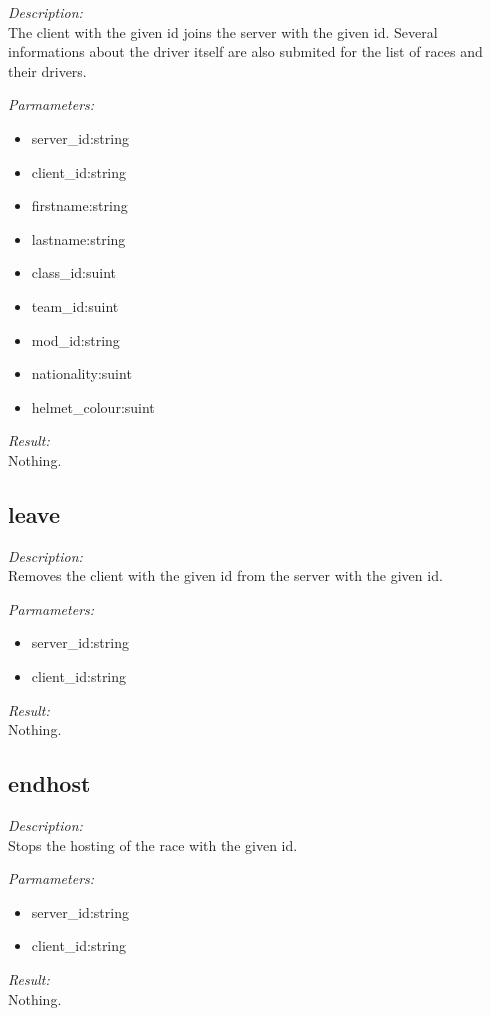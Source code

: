 \begin{description}
\item {\it Description:}\\
The client with the given id joins the server with the given id. Several informations about the driver itself are also submited for the list of races and their drivers.
\item {\it Parmameters:}
\begin{itemize}
\item server\_id:string
\item client\_id:string
\item firstname:string
\item lastname:string
\item class\_id:suint
\item team\_id:suint
\item mod\_id:string
\item nationality:suint
\item helmet\_colour:suint
\end{itemize}
\item {\it Result:}\\
Nothing.
\end{description}

\subsection{leave}

\begin{description}
\item {\it Description:}\\
Removes the client with the given id from the server with the given id.
\item {\it Parmameters:}
\begin{itemize}
\item server\_id:string
\item client\_id:string
\end{itemize}
\item {\it Result:}\\
Nothing.
\end{description}

\subsection{endhost}

\begin{description}
\item {\it Description:}\\
Stops the hosting of the race with the given id.
\item {\it Parmameters:}
\begin{itemize}
\item server\_id:string
\item client\_id:string
\end{itemize}
\item {\it Result:}\\
Nothing.
\end{description}


